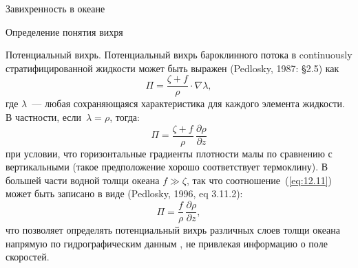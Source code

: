 \begin{chapter}{Завихренность в океане}
\begin{section}{Определение понятия вихря}
\begin{paragraph}{Потенциальный вихрь.}
Потенциальный вихрь бароклинного потока в continuously стратифицированной 
жидкости может быть выражен (Pedlosky, 1987: \S 2.5) как
\begin{equation}
 \Pi = \frac{\zeta + f}{\rho} \cdot \nabla \lambda,
\end{equation}
где $\lambda$~--- любая сохраняющаяся характеристика для каждого элемента
жидкости. В частности, если~$\lambda = \rho$, тогда:
\begin{equation}\label{eq:12.11}
 \Pi = \frac{\zeta + f}{\rho}\,\frac{\partial{\rho}}{\partial{z}}
\end{equation}
при условии, что горизонтальные градиенты плотности малы по сравнению с
вертикальными (такое предположение хорошо соответствует 
термоклину).
В большей части водной толщи океана $f \gg \zeta$, так что 
соотношение~(\ref{eq:12.11}) может быть записано в виде
(Pedlosky, 1996, eq 3.11.2):
\begin{equation}
 \Pi = \frac{f}{\rho}\,\frac{\partial{\rho}}{\partial{z}},
\end{equation}
что позволяет определять потенциальный вихрь различных слоев толщи океана 
напрямую по гидрографическим данным%
, не привлекая информацию 
о поле скоростей.
%
\end{paragraph}
\end{section}


\end{chapter}
